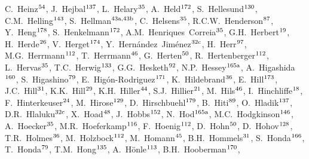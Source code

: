 \begin{flushleft}
C.~Heinz$^\textrm{\scriptsize 54}$,    
J.~Hejbal$^\textrm{\scriptsize 137}$,    
L.~Helary$^\textrm{\scriptsize 35}$,    
A.~Held$^\textrm{\scriptsize 172}$,    
S.~Hellesund$^\textrm{\scriptsize 130}$,    
C.M.~Helling$^\textrm{\scriptsize 143}$,    
S.~Hellman$^\textrm{\scriptsize 43a,43b}$,    
C.~Helsens$^\textrm{\scriptsize 35}$,    
R.C.W.~Henderson$^\textrm{\scriptsize 87}$,    
Y.~Heng$^\textrm{\scriptsize 178}$,    
S.~Henkelmann$^\textrm{\scriptsize 172}$,    
A.M.~Henriques~Correia$^\textrm{\scriptsize 35}$,    
G.H.~Herbert$^\textrm{\scriptsize 19}$,    
H.~Herde$^\textrm{\scriptsize 26}$,    
V.~Herget$^\textrm{\scriptsize 174}$,    
Y.~Hern\'andez~Jim\'enez$^\textrm{\scriptsize 32c}$,    
H.~Herr$^\textrm{\scriptsize 97}$,    
M.G.~Herrmann$^\textrm{\scriptsize 112}$,    
T.~Herrmann$^\textrm{\scriptsize 46}$,    
G.~Herten$^\textrm{\scriptsize 50}$,    
R.~Hertenberger$^\textrm{\scriptsize 112}$,    
L.~Hervas$^\textrm{\scriptsize 35}$,    
T.C.~Herwig$^\textrm{\scriptsize 133}$,    
G.G.~Hesketh$^\textrm{\scriptsize 92}$,    
N.P.~Hessey$^\textrm{\scriptsize 165a}$,    
A.~Higashida$^\textrm{\scriptsize 160}$,    
S.~Higashino$^\textrm{\scriptsize 79}$,    
E.~Hig\'on-Rodriguez$^\textrm{\scriptsize 171}$,    
K.~Hildebrand$^\textrm{\scriptsize 36}$,    
E.~Hill$^\textrm{\scriptsize 173}$,    
J.C.~Hill$^\textrm{\scriptsize 31}$,    
K.K.~Hill$^\textrm{\scriptsize 29}$,    
K.H.~Hiller$^\textrm{\scriptsize 44}$,    
S.J.~Hillier$^\textrm{\scriptsize 21}$,    
M.~Hils$^\textrm{\scriptsize 46}$,    
I.~Hinchliffe$^\textrm{\scriptsize 18}$,    
F.~Hinterkeuser$^\textrm{\scriptsize 24}$,    
M.~Hirose$^\textrm{\scriptsize 129}$,    
D.~Hirschbuehl$^\textrm{\scriptsize 179}$,    
B.~Hiti$^\textrm{\scriptsize 89}$,    
O.~Hladik$^\textrm{\scriptsize 137}$,    
D.R.~Hlaluku$^\textrm{\scriptsize 32c}$,    
X.~Hoad$^\textrm{\scriptsize 48}$,    
J.~Hobbs$^\textrm{\scriptsize 152}$,    
N.~Hod$^\textrm{\scriptsize 165a}$,    
M.C.~Hodgkinson$^\textrm{\scriptsize 146}$,    
A.~Hoecker$^\textrm{\scriptsize 35}$,    
M.R.~Hoeferkamp$^\textrm{\scriptsize 116}$,    
F.~Hoenig$^\textrm{\scriptsize 112}$,    
D.~Hohn$^\textrm{\scriptsize 50}$,    
D.~Hohov$^\textrm{\scriptsize 128}$,    
T.R.~Holmes$^\textrm{\scriptsize 36}$,    
M.~Holzbock$^\textrm{\scriptsize 112}$,    
M.~Homann$^\textrm{\scriptsize 45}$,    
B.H.~Hommels$^\textrm{\scriptsize 31}$,    
S.~Honda$^\textrm{\scriptsize 166}$,    
T.~Honda$^\textrm{\scriptsize 79}$,    
T.M.~Hong$^\textrm{\scriptsize 135}$,    
A.~H\"{o}nle$^\textrm{\scriptsize 113}$,    
B.H.~Hooberman$^\textrm{\scriptsize 170}$,    

\end{flushleft}
